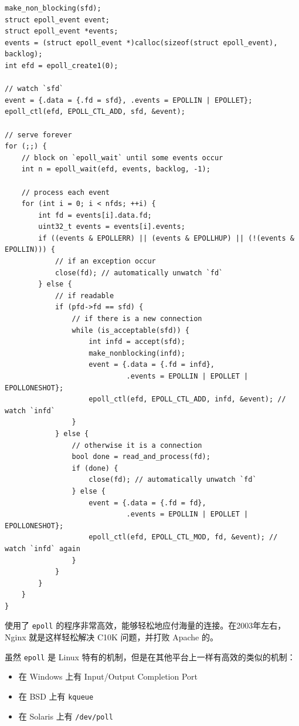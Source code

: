 \documentclass[a4paper]{article}
\providecommand{\tightlist}{\setlength{\itemsep}{0pt}\setlength{\parskip}{0pt}}
\begin{document}
\begin{verbatim}
make_non_blocking(sfd);
struct epoll_event event;
struct epoll_event *events;
events = (struct epoll_event *)calloc(sizeof(struct epoll_event), backlog);
int efd = epoll_create1(0);

// watch `sfd`
event = {.data = {.fd = sfd}, .events = EPOLLIN | EPOLLET};
epoll_ctl(efd, EPOLL_CTL_ADD, sfd, &event);

// serve forever
for (;;) {
    // block on `epoll_wait` until some events occur
    int n = epoll_wait(efd, events, backlog, -1);

    // process each event
    for (int i = 0; i < nfds; ++i) {
        int fd = events[i].data.fd;
        uint32_t events = events[i].events;
        if ((events & EPOLLERR) || (events & EPOLLHUP) || (!(events & EPOLLIN))) {
            // if an exception occur
            close(fd); // automatically unwatch `fd`
        } else {
            // if readable
            if (pfd->fd == sfd) {
                // if there is a new connection
                while (is_acceptable(sfd)) {
                    int infd = accept(sfd);
                    make_nonblocking(infd);
                    event = {.data = {.fd = infd},
                             .events = EPOLLIN | EPOLLET | EPOLLONESHOT};
                    epoll_ctl(efd, EPOLL_CTL_ADD, infd, &event); // watch `infd`
                }
            } else {
                // otherwise it is a connection
                bool done = read_and_process(fd);
                if (done) {
                    close(fd); // automatically unwatch `fd`
                } else {
                    event = {.data = {.fd = fd},
                             .events = EPOLLIN | EPOLLET | EPOLLONESHOT};
                    epoll_ctl(efd, EPOLL_CTL_MOD, fd, &event); // watch `infd` again
                }
            }
        }
    }
}
\end{verbatim}

使用了 \texttt{epoll} 的程序非常高效，能够轻松地应付海量的连接。在2003年左右，Nginx 就是这样轻松解决 C10K 问题，并打败 Apache 的。

虽然 \texttt{epoll} 是 Linux 特有的机制，但是在其他平台上一样有高效的类似的机制：

\begin{itemize}
\tightlist
\item
  在 Windows 上有 Input/Output Completion Port
\item
  在 BSD 上有 \texttt{kqueue}
\item
  在 Solaris 上有 \texttt{/dev/poll}
\end{itemize}
\end{document}
